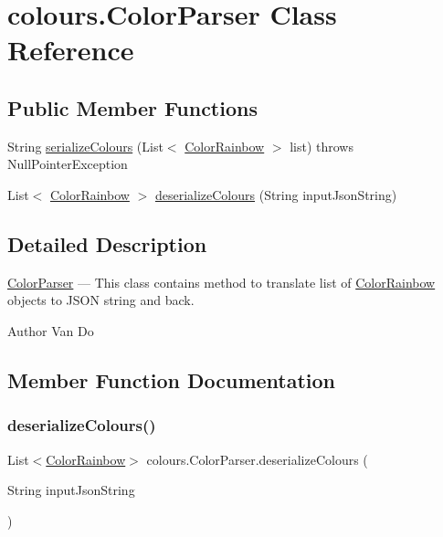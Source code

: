 \hypertarget{classcolours_1_1_color_parser}{}\section{colours.\+Color\+Parser Class Reference}
\label{classcolours_1_1_color_parser}
\subsection*{Public Member Functions}
\begin{DoxyCompactItemize}
\item 
String \hyperlink{classcolours_1_1_color_parser_a3a8b5f6c8bd9045b63fd8e162f3c96d3}{serialize\+Colours} (List$<$ \hyperlink{classcolours_1_1_color_rainbow}{Color\+Rainbow} $>$ list)  throws Null\+Pointer\+Exception     
\item 
List$<$ \hyperlink{classcolours_1_1_color_rainbow}{Color\+Rainbow} $>$ \hyperlink{classcolours_1_1_color_parser_a1b1dd2f7269dd1fe21a88befb27c4f3f}{deserialize\+Colours} (String input\+Json\+String)
\end{DoxyCompactItemize}


\subsection{Detailed Description}
\hyperlink{classcolours_1_1_color_parser}{Color\+Parser} --- This class contains method to translate list of \hyperlink{classcolours_1_1_color_rainbow}{Color\+Rainbow} objects to J\+S\+ON string and back. \begin{DoxyAuthor}{Author}
Van Do 
\end{DoxyAuthor}


\subsection{Member Function Documentation}
\mbox{\label{classcolours_1_1_color_parser_a1b1dd2f7269dd1fe21a88befb27c4f3f}} 
\subsubsection{\texorpdfstring{deserialize\+Colours()}{deserializeColours()}}
{\footnotesize\ttfamily List$<$\hyperlink{classcolours_1_1_color_rainbow}{Color\+Rainbow}$>$ colours.\+Color\+Parser.\+deserialize\+Colours (\begin{DoxyParamCaption}\item[{String}]{input\+Json\+String }\end{DoxyParamCaption})\hspace{0.3cm}{\ttfamily [inline]}}

